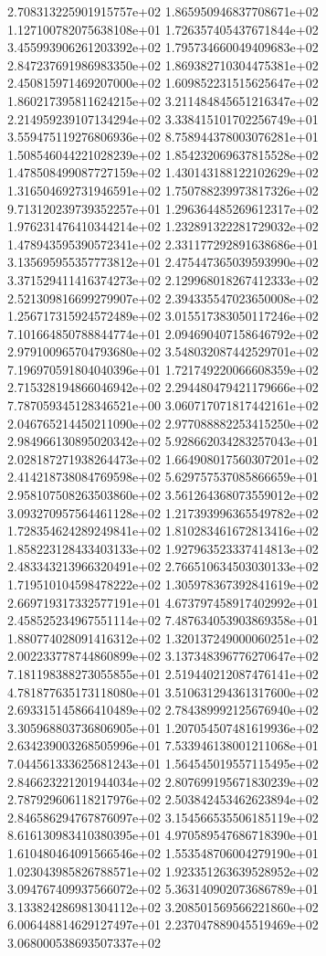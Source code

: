 2.708313225901915757e+02 1.865950946837708671e+02 1.127100782075638108e+01
1.726357405437671844e+02 3.455993906261203392e+02 1.795734660049409683e+02
2.847237691986983350e+02 1.869382710304475381e+02 2.450815971469207000e+02
1.609852231515625647e+02 1.860217395811624215e+02 3.211484845651216347e+02
2.214959239107134294e+02 3.338415101702256749e+01 3.559475119276806936e+02
8.758944378003076281e+01 1.508546044221028239e+02 1.854232069637815528e+02
1.478508499087727159e+02 1.430143188122102629e+02 1.316504692731946591e+02
1.750788239973817326e+02 9.713120239739352257e+01 1.296364485269612317e+02
1.976231476410344214e+02 1.232891322281729032e+02 1.478943595390572341e+02
2.331177292891638686e+01 3.135695955357773812e+01 2.475447365039593990e+02
3.371529411416374273e+02 2.129968018267412333e+02 2.521309816699279907e+02
2.394335547023650008e+02 1.256717315924572489e+02 3.015517383050117246e+02
7.101664850788844774e+01 2.094690407158646792e+02 2.979100965704793680e+02
3.548032087442529701e+02 7.196970591804040396e+01 1.721749220066608359e+02
2.715328194866046942e+02 2.294480479421179666e+02 7.787059345128346521e+00
3.060717071817442161e+02 2.046765214450211090e+02 2.977088882253415250e+02
2.984966130895020342e+02 5.928662034283257043e+01 2.028187271938264473e+02
1.664908017560307201e+02 2.414218738084769598e+02 5.629757537085866659e+01
2.958107508263503860e+02 3.561264368073559012e+02 3.093270957564461128e+02
1.217393996365549782e+02 1.728354624289249841e+02 1.810283461672813416e+02
1.858223128433403133e+02 1.927963523337414813e+02 2.483343213966320491e+02
2.766510634503030133e+02 1.719510104598478222e+02 1.305978367392841619e+02
2.669719317332577191e+01 4.673797458917402992e+01 2.458525234967551114e+02
7.487634053903869358e+01 1.880774028091416312e+02 1.320137249000060251e+02
2.002233778744860899e+02 3.137348396776270647e+02 7.181198388273055855e+01
2.519440212087476141e+02 4.781877635173118080e+01 3.510631294361317600e+02
2.693315145866410489e+02 2.784389992125676940e+02 3.305968803736806905e+01
1.207054507481619936e+02 2.634239003268505996e+01 7.533946138001211068e+01
7.044561333625681243e+01 1.564545019557115495e+02 2.846623221201944034e+02
2.807699195671830239e+02 2.787929606118217976e+02 2.503842453462623894e+02
2.846586294767876097e+02 3.154566535506185119e+02 8.616130983410380395e+01
4.970589547686718390e+01 1.610480464091566546e+02 1.553548706004279190e+01
1.023043985826788571e+02 1.923351263639528952e+02 3.094767409937566072e+02
5.363140902073686789e+01 3.133824286981304112e+02 3.208501569566221860e+02
6.006448814629127497e+01 2.237047889045519469e+02 3.068000538693507337e+02
